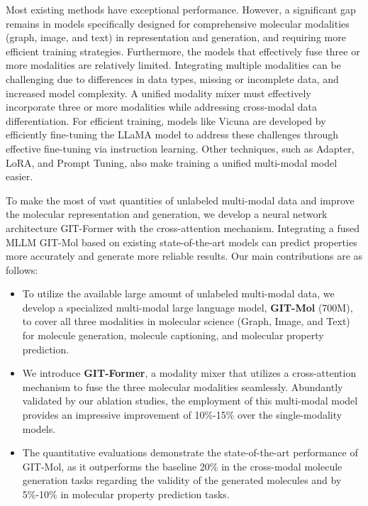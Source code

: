 \documentclass{article}
\begin{document}
Most existing methods have exceptional performance. However, a significant gap remains in models specifically designed for comprehensive molecular modalities (graph, image, and text) in representation and generation, and requiring more efficient training strategies. 
Furthermore, the models that effectively fuse three or more modalities are relatively limited. 
Integrating multiple modalities can be challenging due to differences in data types, missing or incomplete data, and increased model complexity. 
A unified modality mixer must effectively incorporate three or more modalities while addressing cross-modal data differentiation. 
For efficient training, models like Vicuna\cite{chiang2023vicuna} are developed by efficiently fine-tuning the LLaMA model\cite{touvron2023llama} to address these challenges through effective fine-tuning via instruction learning. Other techniques, such as Adapter\cite{zhang2023llamaadapter}, LoRA\cite{hu2021lora}, and Prompt Tuning\cite{lester2021power}, also make training a unified multi-modal model easier. 

To make the most of vast quantities of unlabeled multi-modal data and improve the molecular representation and generation, we develop a neural network architecture GIT-Former with the cross-attention mechanism. 
Integrating a fused MLLM GIT-Mol based on existing state-of-the-art models can predict properties more accurately and generate more reliable results. 
Our main contributions are as follows:

\begin{itemize}
\item To utilize the available large amount of unlabeled multi-modal data, we develop a specialized multi-modal large language model, \textbf{GIT-Mol} (700M), to cover all three modalities in molecular science (Graph, Image, and Text) for molecule generation, molecule captioning, and molecular property prediction.
\item We introduce \textbf{GIT-Former}, a modality mixer that utilizes a cross-attention mechanism to fuse the three molecular modalities seamlessly. Abundantly validated by our ablation studies, the employment of this multi-modal model provides an impressive improvement of 10\%-15\% over the single-modality models.
\item The quantitative evaluations demonstrate the state-of-the-art performance of GIT-Mol, as it outperforms the baseline 20\% in the cross-modal molecule generation tasks regarding the validity of the generated molecules and by 5\%-10\% in molecular property prediction tasks.
\end{itemize}
\end{document}

